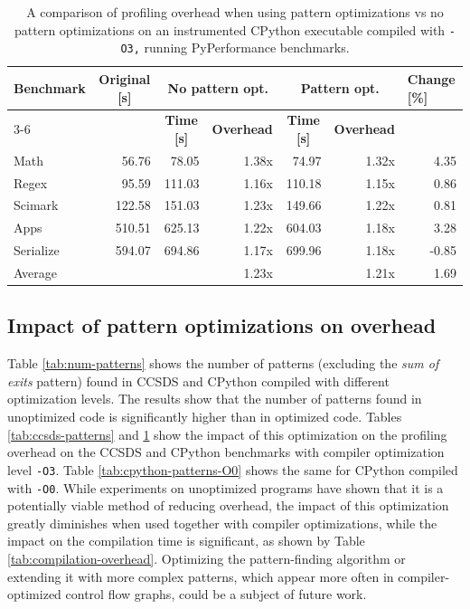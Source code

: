 \begin{table}[]
    \centering
    {\small{\begin{tabular}{lrrrrrr}
    \multicolumn{1}{l}{\multirow{2}{*}{\textbf{Benchmark}}} & \multicolumn{1}{c}{\multirow{2}{*}{\textbf{Original [s]}}} & \multicolumn{2}{c}{\textbf{No pattern opt.}} & \multicolumn{2}{c}{\textbf{Pattern opt.}} & \multicolumn{1}{l}{\multirow{2}{*}{\textbf{Change [\%]}}} \\
    \cline{3-6} 
    \multicolumn{1}{l}{} & \multicolumn{1}{c}{} & \multicolumn{1}{c}{\textbf{Time [s]}} & \multicolumn{1}{c}{\textbf{Overhead}} & \multicolumn{1}{c}{\textbf{Time [s]}} & \multicolumn{1}{c}{\textbf{Overhead}} \\ 
    \hline
    \hline
    Math & 56.76 & 78.05 & 1.38x & 74.97 & 1.32x & 4.35\\
    Regex & 95.59 & 111.03 & 1.16x  & 110.18 & 1.15x & 0.86 \\
    Scimark & 122.58  & 151.03 & 1.23x & 149.66 & 1.22x & 0.81 \\
    Apps & 510.51 & 625.13 & 1.22x & 604.03 & 1.18x & 3.28 \\
    Serialize & 594.07 & 694.86 & 1.17x & 699.96 & 1.18x & -0.85 \\
    \hline
    \multicolumn{1}{l}{Average} & & & 1.23x & & 1.21x & 1.69 \\
    \end{tabular}
    }}
    \caption{A comparison of profiling overhead when using pattern optimizations vs no pattern optimizations on an instrumented CPython executable compiled with \texttt{-O3,} running PyPerformance benchmarks.}
    \label{tab:cpython-patterns}
\end{table}

\subsection{Impact of pattern optimizations on overhead}

Table \ref{tab:num-patterns} shows the number of patterns (excluding the \emph{sum of exits} pattern) found in CCSDS and CPython compiled with different optimization levels. The results show that the number of patterns found in unoptimized code is significantly higher than in optimized code. Tables \ref{tab:ccsds-patterns} and \ref{tab:cpython-patterns} show the impact of this optimization on the profiling overhead on the CCSDS and CPython benchmarks with compiler optimization level \texttt{-O3}.
Table \ref{tab:cpython-patterns-O0} shows the same for CPython compiled with \texttt{-O0}. While experiments on unoptimized programs have shown that it is a potentially viable method of reducing overhead, the impact of this optimization greatly diminishes when used together with compiler optimizations, while the impact on the compilation time is significant, as shown by Table \ref{tab:compilation-overhead}. Optimizing the pattern-finding algorithm or extending it with more complex patterns, which appear more often in compiler-optimized control flow graphs, could be a subject of future work.

